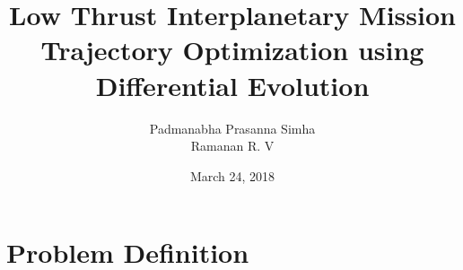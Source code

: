 \documentclass{beamer}
\title[Low Thrust Interplanetary Trajectory Optimization using DE]{Low Thrust Interplanetary Mission Trajectory Optimization using Differential Evolution} %
\author[Padmanbha Prasanna Simha, Ramanan R. V (IIST)]{Padmanabha Prasanna Simha\\Ramanan R. V} %
\institute[IIST] %
{
Indian Institute of Space Science and Technology \\ for\\ National Conference on Multidisciplinary Design, Analysis and Optimization\\ (Indian Institute of Science - Bangalore)%
\medskip
}
\date{March 24, 2018} %
\begin{document}
\begin{frame}
\titlepage %
\end{frame}



\section{Problem Definition}
\end{document}

